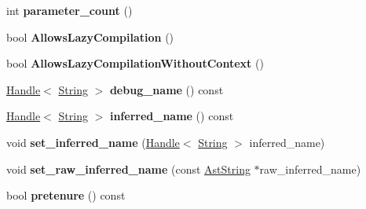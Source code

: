 \begin{DoxyCompactItemize}
\item 
int {\bfseries parameter\+\_\+count} ()\hypertarget{classv8_1_1internal_1_1_function_literal_afba4a2fe6bb0ef660bc62e0df12c7985}{}\label{classv8_1_1internal_1_1_function_literal_afba4a2fe6bb0ef660bc62e0df12c7985}

\item 
bool {\bfseries Allows\+Lazy\+Compilation} ()\hypertarget{classv8_1_1internal_1_1_function_literal_a7d0a890afce7b8f84d089de0c66dee1b}{}\label{classv8_1_1internal_1_1_function_literal_a7d0a890afce7b8f84d089de0c66dee1b}

\item 
bool {\bfseries Allows\+Lazy\+Compilation\+Without\+Context} ()\hypertarget{classv8_1_1internal_1_1_function_literal_a01ed56e7a07e11a9995f81c642e293e6}{}\label{classv8_1_1internal_1_1_function_literal_a01ed56e7a07e11a9995f81c642e293e6}

\item 
\hyperlink{classv8_1_1internal_1_1_handle}{Handle}$<$ \hyperlink{classv8_1_1internal_1_1_string}{String} $>$ {\bfseries debug\+\_\+name} () const \hypertarget{classv8_1_1internal_1_1_function_literal_a601f96056a779c2753c8d1ce297bf517}{}\label{classv8_1_1internal_1_1_function_literal_a601f96056a779c2753c8d1ce297bf517}

\item 
\hyperlink{classv8_1_1internal_1_1_handle}{Handle}$<$ \hyperlink{classv8_1_1internal_1_1_string}{String} $>$ {\bfseries inferred\+\_\+name} () const \hypertarget{classv8_1_1internal_1_1_function_literal_a157f238ddf61e418498fbf1f11ec8b4a}{}\label{classv8_1_1internal_1_1_function_literal_a157f238ddf61e418498fbf1f11ec8b4a}

\item 
void {\bfseries set\+\_\+inferred\+\_\+name} (\hyperlink{classv8_1_1internal_1_1_handle}{Handle}$<$ \hyperlink{classv8_1_1internal_1_1_string}{String} $>$ inferred\+\_\+name)\hypertarget{classv8_1_1internal_1_1_function_literal_a80eb85688afb619fdebfcea87d02990f}{}\label{classv8_1_1internal_1_1_function_literal_a80eb85688afb619fdebfcea87d02990f}

\item 
void {\bfseries set\+\_\+raw\+\_\+inferred\+\_\+name} (const \hyperlink{classv8_1_1internal_1_1_ast_string}{Ast\+String} $\ast$raw\+\_\+inferred\+\_\+name)\hypertarget{classv8_1_1internal_1_1_function_literal_abf94a55b603d6744c818741b38e2c6b4}{}\label{classv8_1_1internal_1_1_function_literal_abf94a55b603d6744c818741b38e2c6b4}

\item 
bool {\bfseries pretenure} () const \hypertarget{classv8_1_1internal_1_1_function_literal_a8b72abd02b485827df4f09125d1728bc}{}\label{classv8_1_1internal_1_1_function_literal_a8b72abd02b485827df4f09125d1728bc}


\end{DoxyCompactItemize}
